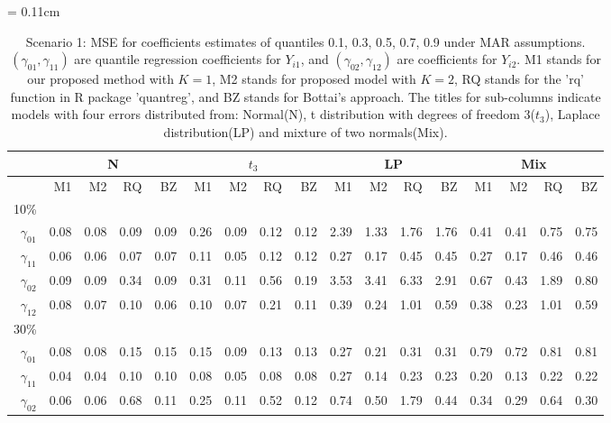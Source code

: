 \documentclass[useAMS,usenatbib,referee]{biom}
\begin{document}
  \begin{table}
\centering
    \caption{Scenario 1: MSE for coefficients estimates of quantiles 0.1, 0.3, 0.5, 0.7, 0.9 under MAR assumptions.
$(\gamma_{01}, \gamma_{11})$ are quantile regression coefficients for $Y_{i1}$, and $(\gamma_{02}, \gamma_{12})$ are coefficients for $Y_{i2}$. M1 stands for our proposed method with $K = 1$, M2 stands for proposed model with $K = 2$, RQ stands for the 'rq' function in R package 'quantreg', and BZ stands for Bottai's approach.
The titles for sub-columns indicate models with four errors distributed from: Normal(N), t distribution with degrees of freedom 3($t_3$),
Laplace distribution(LP) and mixture of two normals(Mix).
}\label{tab:simh2}
    \vspace{10pt} \tabcolsep = 0.11cm
    \begin{tabular}{rrrrrrrrrrrrrrrrr}
      \hline
              & \multicolumn{4}{c}{N} & \multicolumn{4}{c}{$t_3$}   & \multicolumn{4}{c}{LP}   & \multicolumn{4}{c}{Mix}   \\
      \hline
           & M1                      & M2 & RQ & BZ   & M1                      & M2 & RQ & BZ   & M1                      & M2 & RQ & BZ   & M1                      & M2 & RQ & BZ \\
10\%  \\
$\gamma_{01}$ & 0.08 & 0.08 & 0.09 & 0.09 & 0.26 & 0.09 & 0.12 & 0.12 & 2.39 & 1.33 & 1.76 & 1.76 & 0.41 & 0.41 & 0.75 & 0.75 \\
$\gamma_{11}$ & 0.06 & 0.06 & 0.07 & 0.07 & 0.11 & 0.05 & 0.12 & 0.12 & 0.27 & 0.17 & 0.45 & 0.45 & 0.27 & 0.17 & 0.46 & 0.46 \\
$\gamma_{02}$ & 0.09 & 0.09 & 0.34 & 0.09 & 0.31 & 0.11 & 0.56 & 0.19 & 3.53 & 3.41 & 6.33 & 2.91 & 0.67 & 0.43 & 1.89 & 0.80 \\
$\gamma_{12}$ & 0.08 & 0.07 & 0.10 & 0.06 & 0.10 & 0.07 & 0.21 & 0.11 & 0.39 & 0.24 & 1.01 & 0.59 & 0.38 & 0.23 & 1.01 & 0.59 \\
30\% \\
$\gamma_{01}$ & 0.08 & 0.08 & 0.15 & 0.15 & 0.15 & 0.09 & 0.13 & 0.13 & 0.27 & 0.21 & 0.31 & 0.31 & 0.79 & 0.72 & 0.81 & 0.81 \\
$\gamma_{11}$ & 0.04 & 0.04 & 0.10 & 0.10 & 0.08 & 0.05 & 0.08 & 0.08 & 0.27 & 0.14 & 0.23 & 0.23 & 0.20 & 0.13 & 0.22 & 0.22 \\
$\gamma_{02}$ & 0.06 & 0.06 & 0.68 & 0.11 & 0.25 & 0.11 & 0.52 & 0.12 & 0.74 & 0.50 & 1.79 & 0.44 & 0.34 & 0.29 & 0.64 & 0.30 \\

\end{tabular}
\end{table}
\end{document}
